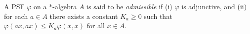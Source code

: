 A PSF $\varphi$ on a $*$-algebra $A$ is said to be \textit{admissible} if (i) $\varphi$ is adjunctive, and (ii) for each $a \in A$ there exists a constant $K_a \geq 0$ such that $\varphi(ax, ax) \leq K_a \varphi(x, x)$ for all $x \in A$.
